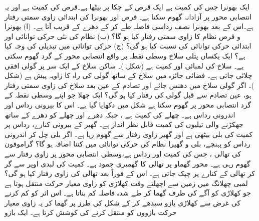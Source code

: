 ایک بھونرا جس کی کمیت  ہے ایک قرص کے چکا پر بیٹھا ہے۔قرص کی کمیت   ہے اور یہ انتصابی محور پر آزادانہ گھوم سکتا ہے۔ قرص اور بھونرا کی ابتدائی زاوی  سمتی  رفتار   ہے۔اس کے بعد  بھونرا  نصف رداسی فاصلہ طے کر کے دھرے کے قریب آتا ہے۔ (ا)  بھونرا و قرص نظام کا زاوی سمتی رفتار کیا ہو گا؟ (ب)  نظام کی نئی حرکی توانائی  اور ابتدائی حرکی توانائی  کی نسبت   کیا ہو گی؟ (ج)  حرکی توانائی میں تبدیلی کی وجہ کیا ہے؟
ایک یکساں پتلی سلاخ وسطی نقطہ     پر واقع انتصابی  محور کے گرد گھوم سکتی ہے۔ سلاخ کی لمبائی  اور کمیت  ہے (شکل )۔ ساکن سلاخ کے ایک سر   پر  گولی  افقی چلائی جاتی ہے۔ فضائی جائزہ میں سلاخ کے ساتھ  گولی کی راہ  کا زاویہ  پیش ہے (شکل )۔ اگر گولی سلاخ میں دھنس جائے اور تصادم کے عین بعد سلاخ کی زاوی سمتی رفتار  ہو،  عین تصادم سے  قبل   گولی کی  رفتار کیا ہو گی؟
ایک چھلا جو اپنے  وسطی نقطہ  کے گرد انتصابی محور پر گھوم سکتا ہے شکل  میں دکھایا گیا ہے۔ اس کا بیرونی رداس  اور اندرونی رداس   ہے۔ چھلے کی کمیت  ہے ، جبکہ دھرے اور چھلے کو دھرے کے ساتھ جھکڑنے والی تیلیوں کی کمیت قابل نظر انداز ہے۔ گھیر  کے بیرونی کنارے، رداس  پر کمیت  کی بلی بیٹھی ہے اور
 گھیر  زاوی رفتار سے گھوم رہا ہے۔ اگر بلی چل کر  اندرونی رداس  کو پہنچے، بلی  و گھیرا  نظام کی حرکی توانائی میں کتنا اضافہ ہو گا؟
گراموفون کی تھالی ، جس کی کمیت   اور رداس  ہے،وسطی   انتصابی محور پر   زاوی رفتار  سے گھوم رہی ہے۔ محور گھماو پر تھالی کا گھمیری جمود  ہے۔ کمیت
  کی لبدی  اوپر سے گر کر تھالی کے کنارے پر  چپک جاتی ہے۔ اس کے فوراً بعد تھالی کی زاوی رفتار کیا ہو گی؟
لمبی چھلانگ میں    زمین سے اچھلتے  وقت کھلاڑی کو زاوی  معیار حرکت  منتقل ہوتا ہے جو کھلاڑی کو آگے کی طرف  گھما  کر طے شدہ  فاصلہ  کم بناتا ہے۔ اس اثر کو کم کرنے کی غرض سے کھلاڑی  بازو   سیدھے کر کے شکل  کی طرز پر گھما کر یہ    زاوی معیار حرکت    بازووں  کو منتقل  کرنے کی کوشش کرتا ہے۔ ایک بازو 
